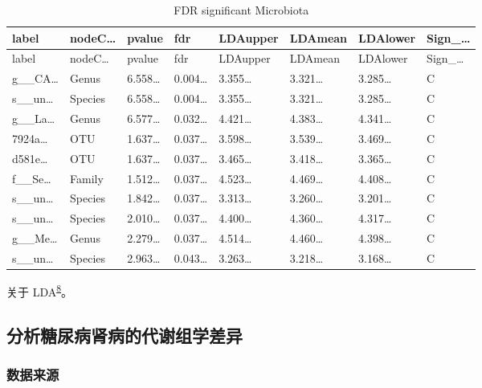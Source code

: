 \documentclass[
]{article}
\begin{document}
\begin{longtable}[]{@{}llllllll@{}}
\caption{\label{tab:FDR-significant-Microbiota}FDR significant Microbiota}\tabularnewline
\toprule
label & nodeC\ldots{} & pvalue & fdr & LDAupper & LDAmean & LDAlower & Sign\_\ldots{}\tabularnewline
\midrule
\endfirsthead
\toprule
label & nodeC\ldots{} & pvalue & fdr & LDAupper & LDAmean & LDAlower & Sign\_\ldots{}\tabularnewline
\midrule
\endhead
g\_\_CA\ldots{} & Genus & 6.558\ldots{} & 0.004\ldots{} & 3.355\ldots{} & 3.321\ldots{} & 3.285\ldots{} & C\tabularnewline
s\_\_un\ldots{} & Species & 6.558\ldots{} & 0.004\ldots{} & 3.355\ldots{} & 3.321\ldots{} & 3.285\ldots{} & C\tabularnewline
g\_\_La\ldots{} & Genus & 6.577\ldots{} & 0.032\ldots{} & 4.421\ldots{} & 4.383\ldots{} & 4.341\ldots{} & C\tabularnewline
7924a\ldots{} & OTU & 1.637\ldots{} & 0.037\ldots{} & 3.598\ldots{} & 3.539\ldots{} & 3.469\ldots{} & C\tabularnewline
d581e\ldots{} & OTU & 1.637\ldots{} & 0.037\ldots{} & 3.465\ldots{} & 3.418\ldots{} & 3.365\ldots{} & C\tabularnewline
f\_\_Se\ldots{} & Family & 1.512\ldots{} & 0.037\ldots{} & 4.523\ldots{} & 4.469\ldots{} & 4.408\ldots{} & C\tabularnewline
s\_\_un\ldots{} & Species & 1.842\ldots{} & 0.037\ldots{} & 3.313\ldots{} & 3.260\ldots{} & 3.201\ldots{} & C\tabularnewline
s\_\_un\ldots{} & Species & 2.010\ldots{} & 0.037\ldots{} & 4.400\ldots{} & 4.360\ldots{} & 4.317\ldots{} & C\tabularnewline
g\_\_Me\ldots{} & Genus & 2.279\ldots{} & 0.037\ldots{} & 4.514\ldots{} & 4.460\ldots{} & 4.398\ldots{} & C\tabularnewline
s\_\_un\ldots{} & Species & 2.963\ldots{} & 0.043\ldots{} & 3.263\ldots{} & 3.218\ldots{} & 3.168\ldots{} & C\tabularnewline
\bottomrule
\end{longtable}

关于 LDA\textsuperscript{\protect\hyperlink{ref-MicrobiomeDataRaiS2021}{8}}。

\hypertarget{ux5206ux6790ux7cd6ux5c3fux75c5ux80beux75c5ux7684ux4ee3ux8c22ux7ec4ux5b66ux5deeux5f02}{%
\subsection{分析糖尿病肾病的代谢组学差异}\label{ux5206ux6790ux7cd6ux5c3fux75c5ux80beux75c5ux7684ux4ee3ux8c22ux7ec4ux5b66ux5deeux5f02}}

\hypertarget{ux6570ux636eux6765ux6e90}{%
\subsubsection{数据来源}\label{ux6570ux636eux6765ux6e90}}
\end{document}

